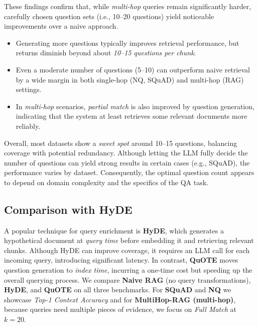 These findings confirm that, while \emph{multi-hop} queries remain significantly harder, carefully chosen question sets 
(i.e., 10–20 questions) yield noticeable improvements over a naive approach.

\begin{itemize}
    \item Generating more questions typically improves retrieval performance, but returns diminish beyond 
    about \emph{10–15 questions per chunk}.
    \item Even a moderate number of questions (5–10) can outperform naive retrieval by a wide margin in both 
    single-hop (NQ, SQuAD) and multi-hop (RAG) settings.
    \item In \emph{multi-hop} scenarios, \emph{partial match} is also improved by question generation, 
    indicating that the system at least retrieves some relevant documents more reliably.
\end{itemize}

Overall, most datasets show a \emph{sweet spot} around 10–15 questions, balancing coverage with potential redundancy. 
Although letting the LLM fully decide the number of questions can yield strong results in certain cases (e.g., SQuAD), 
the performance varies by dataset. Consequently, the optimal question count appears to depend on domain complexity 
and the specifics of the QA task.

\subsection{Comparison with HyDE}
\label{subsec:compare-hyde}



A popular technique for query enrichment is \textbf{HyDE}, which generates a hypothetical document at \emph{query time} before embedding it and retrieving relevant chunks. Although HyDE can improve coverage, it requires an LLM call for each incoming query, introducing significant latency. In contrast, \textbf{QuOTE} moves question generation to \emph{index time}, incurring a one-time cost but speeding up the overall querying process. We compare \textbf{Naive RAG} (no query transformations), \textbf{HyDE}, and \textbf{QuOTE} on all three benchmarks. For \textbf{SQuAD} and \textbf{NQ} we showcase
\emph{Top-1 Context Accuracy}
and for \textbf{MultiHop-RAG (multi-hop)}, because queries need multiple pieces of evidence, we focus on \emph{Full Match} at \(k=20\). 

